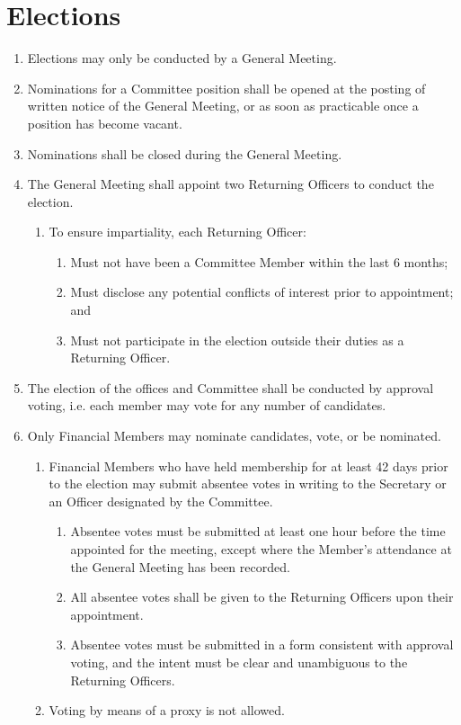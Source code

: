 \documentclass[a4paper]{article}
\begin{document}
\section{Elections} \label{sec:elections}
\begin{enumerate}
    \item Elections may only be conducted by a General Meeting.
    \item Nominations for a Committee position shall be opened at the posting of written notice of the General Meeting, or as soon as practicable once a position has become vacant.
    \item Nominations shall be closed during the General Meeting.
    \item The General Meeting shall appoint two Returning Officers to conduct the election.
          \begin{enumerate}
              \item To ensure impartiality, each Returning Officer:
                    \begin{enumerate}
                        \item Must not have been a Committee Member within the last 6 months;
                        \item Must disclose any potential conflicts of interest prior to appointment; and
                        \item Must not participate in the election outside their duties as a Returning Officer.
                    \end{enumerate}
          \end{enumerate}
    \item The election of the offices and Committee shall be conducted by approval voting, i.e. each member may vote for any number of candidates.
    \item Only Financial Members may nominate candidates, vote, or be nominated.
          \begin{enumerate}
              \item Financial Members who have held membership for at least 42 days prior to the election may submit absentee votes in writing to the Secretary or an Officer designated by the Committee.
                    \begin{enumerate}
                        \item Absentee votes must be submitted at least one hour before the time appointed for the meeting, except where the Member’s attendance at the General Meeting has been recorded.
                        \item All absentee votes shall be given to the Returning Officers upon their appointment.
                        \item Absentee votes must be submitted in a form consistent with approval voting, and the intent must be clear and unambiguous to the Returning Officers.
                    \end{enumerate}
              \item Voting by means of a proxy is not allowed.
          \end{enumerate}
\end{enumerate}
\end{document}
